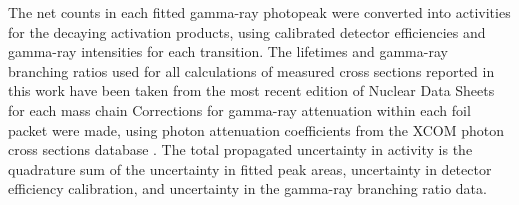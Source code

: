 The net  counts in each fitted gamma-ray photopeak were converted into  activities for the decaying  activation products, using calibrated detector efficiencies and gamma-ray intensities for each transition.
% 
% 
% 
The   lifetimes and gamma-ray branching ratios  used for all calculations of measured cross sections reported in this work  have been taken from the most recent edition of  Nuclear Data Sheets for each  mass chain
Corrections for gamma-ray attenuation within each foil packet were made, using  photon attenuation coefficients from the XCOM photon cross sections database  \cite{berger2011xcom}.
The total propagated uncertainty in  activity is the quadrature sum of the uncertainty in  fitted peak areas, uncertainty in detector efficiency calibration, and uncertainty in the gamma-ray branching ratio data.




